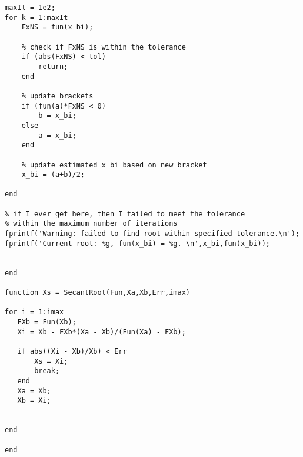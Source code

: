 \begin{lstlisting}[style=myMatlab,name=lec28n-ex1]
maxIt = 1e2;
for k = 1:maxIt
    FxNS = fun(x_bi);
    
    % check if FxNS is within the tolerance
    if (abs(FxNS) < tol)
        return;
    end
    
    % update brackets
    if (fun(a)*FxNS < 0)
        b = x_bi;
    else
        a = x_bi;
    end
    
    % update estimated x_bi based on new bracket
    x_bi = (a+b)/2;
       
end

% if I ever get here, then I failed to meet the tolerance 
% within the maximum number of iterations
fprintf('Warning: failed to find root within specified tolerance.\n');
fprintf('Current root: %g, fun(x_bi) = %g. \n',x_bi,fun(x_bi));


end

function Xs = SecantRoot(Fun,Xa,Xb,Err,imax)

for i = 1:imax
   FXb = Fun(Xb);
   Xi = Xb - FXb*(Xa - Xb)/(Fun(Xa) - FXb);
   
   if abs((Xi - Xb)/Xb) < Err
       Xs = Xi;
       break;
   end
   Xa = Xb;
   Xb = Xi;
     
        
end

end

\end{lstlisting}

